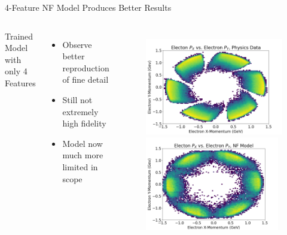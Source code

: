 \documentclass[aspectratio=169]{beamer}
\begin{document}
\begin{frame}{4-Feature NF Model Produces Better Results}
   \begin{columns}
           Trained Model with only 4 Features
            \begin{itemize}
                    \setlength\itemsep{0.3em}
                    \item Observe better reproduction of fine detail
                    \item Still not extremely high fidelity
                    \item Model now much more limited in scope
            \end{itemize}
   
            \begin{figure}[H]
            \centering
            \includegraphics[width=.97\textwidth]{images/2D_Hists_4F/Electon_P_X_vs_Electron_P_Y,_Physics_Data.png}
            \includegraphics[width=0.97\textwidth,trim={0 0 0 0},clip]{images/Hists2D/Electon_P_X_vs_Electron_P_Y,_NF_Model.png}
            

\end{figure}
\end{columns}
\end{frame}
\end{document}

